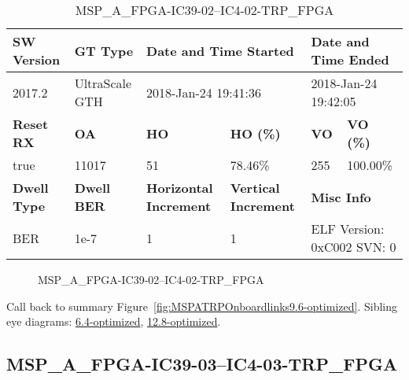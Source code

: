 \begin{table}[h]
\centering
\caption{MSP\_A\_FPGA-IC39-02--IC4-02-TRP\_FPGA}
\label{tab:MSPAFPGAIC3902IC402TRPFPGA9.6-optimized}
\begin{tabular}{@{}|l|l|l|l|l|l|@{}}
\toprule
\textbf{SW Version}                & \textbf{GT Type}   & \multicolumn{2}{l|}{\textbf{Date and Time Started}}            & \multicolumn{2}{l|}{\textbf{Date and Time Ended}}        \\ \midrule
2017.2                       & UltraScale GTH          & \multicolumn{2}{l|}{2018-Jan-24 19:41:36}                   & \multicolumn{2}{l|}{2018-Jan-24 19:42:05}               \\ \midrule
\textbf{Reset RX}                  & \textbf{OA} & \textbf{HO}   & \textbf{HO (\%)} & \textbf{VO} & \textbf{VO (\%)} \\ \midrule
true & 11017        & 51          & 78.46\%        & 255        & 100.00\%       \\ \midrule
\textbf{Dwell Type}                & \textbf{Dwell BER} & \textbf{Horizontal Increment} & \textbf{Vertical Increment}    & \multicolumn{2}{l|}{\textbf{Misc Info}}                  \\ \midrule
BER                            & 1e-7        & 1        & 1           & \multicolumn{2}{l|}{ELF Version: 0xC002 SVN: 0}                         \\ \bottomrule
\end{tabular}
\end{table}

\begin{figure}[h]
\caption{MSP\_A\_FPGA-IC39-02--IC4-02-TRP\_FPGA} \label{fig:MSPAFPGAIC3902IC402TRPFPGA9.6-optimized}
\end{figure}

Call back to summary Figure~\ref{fig:MSPATRPOnboardlinks9.6-optimized}.
Sibling eye diagrams: \hyperref[sec:MSPAFPGAIC3902IC402TRPFPGA6.4-optimized]{6.4-optimized}, \hyperref[sec:MSPAFPGAIC3902IC402TRPFPGA12.8-optimized]{12.8-optimized}.

\clearpage
\newpage


\subsection{MSP\_A\_FPGA-IC39-03--IC4-03-TRP\_FPGA}\label{sec:MSPAFPGAIC3903IC403TRPFPGA9.6-optimized}

